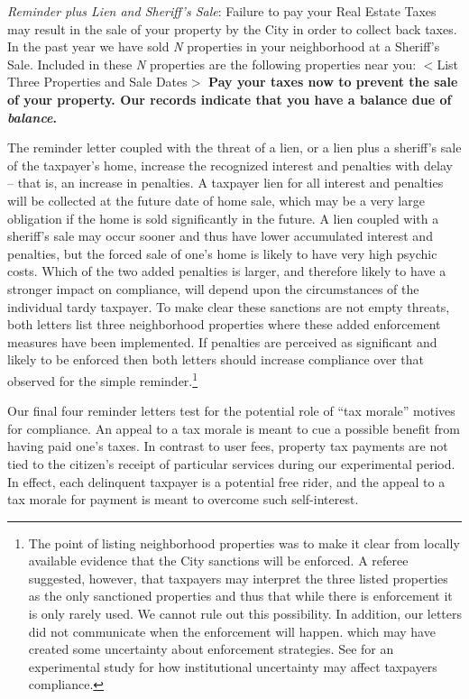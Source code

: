 \documentclass[12pt]{article}
\begin{document}
\noindent \textit{Reminder plus Lien and Sheriff's Sale}: Failure to
pay your Real Estate Taxes may result in the sale of your property by
the City in order to collect back taxes.  In the past year we have
sold \textit{N} properties in your neighborhood at a Sheriff's Sale.
Included in these \textit{N} properties are the following properties
near you: $<$List Three Properties and Sale Dates$>$ \textbf{Pay your
  taxes now to prevent the sale of your property.  Our records
  indicate that you have a balance due of \textit{balance}.}

The reminder letter coupled with the threat of a lien, or a lien plus
a sheriff's sale of the taxpayer's home, increase the recognized
interest and penalties with delay -- that is, an increase in
penalties.  A taxpayer lien for all interest and penalties will be
collected at the future date of home sale, which may be a very large
obligation if the home is sold significantly in the future.  A lien
coupled with a sheriff's sale may occur sooner and thus have lower
accumulated interest and penalties, but the forced sale of one's home
is likely to have very high psychic costs.  Which of the two added
penalties is larger, and therefore likely to have a stronger impact on
compliance, will depend upon the circumstances of the individual tardy
taxpayer. To make clear these sanctions are not empty threats, both
letters list three neighborhood properties where these added
enforcement measures have been implemented.  If penalties are
perceived as significant and likely to be enforced then both letters
should increase compliance over that observed for the simple
reminder.\footnote{The point of listing neighborhood properties was to
  make it clear from locally available evidence that the City
  sanctions will be enforced. A referee suggested, however, that
  taxpayers may interpret the three listed properties as the only
  sanctioned properties and thus that while there is enforcement it is
  only rarely used.  We cannot rule out this possibility. In addition,
  our letters did not communicate when the enforcement will
  happen. which may have created some uncertainty about enforcement
  strategies. See  for an experimental
  study for how institutional uncertainty may affect taxpayers
  compliance.}

Our final four reminder letters test for the potential role of ``tax
morale'' motives for compliance.  An appeal to a tax morale is meant
to cue a possible benefit from having paid one's taxes.  In contrast
to user fees, property tax payments are not tied to the citizen's
receipt of particular services during our experimental period.  In
effect, each delinquent taxpayer is a potential free rider, and the
appeal to a tax morale for payment is meant to overcome such
self-interest.
\end{document}
